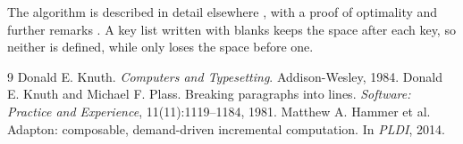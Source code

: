 \documentclass{article}
\begin{document}
The algorithm is described in detail elsewhere \cite[p.~12]{knuth84}, with a
proof of optimality \cite[Section~3]{plass81} and further remarks
\cite[pp.~5--9]{knuth84,plass81}. A key list written with blanks
\cite{ knuth84 , adapton } keeps the space after each key, so neither is
defined, while \cite{knuth84, adapton} only loses the space before one.

\begin{thebibliography}{9}
 Donald E. Knuth. \emph{Computers and Typesetting}. Addison-Wesley, 1984.
 Donald E. Knuth and Michael F. Plass. Breaking paragraphs
  into lines. \emph{Software: Practice and Experience}, 11(11):1119--1184, 1981.
 Matthew A. Hammer et al. Adapton: composable, demand-driven
  incremental computation. In \emph{PLDI}, 2014.
\end{thebibliography}
\end{document}
